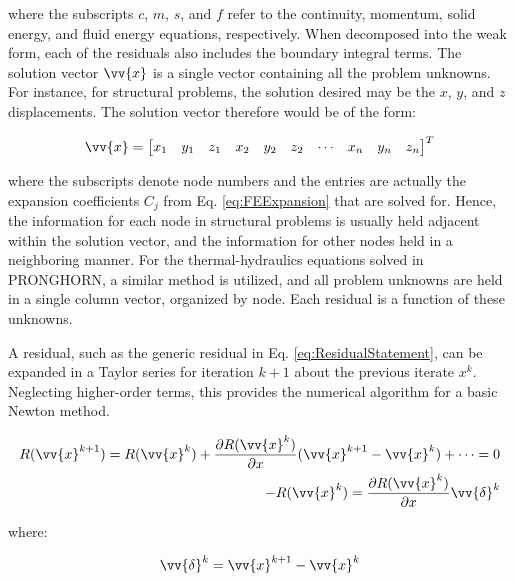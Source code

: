 \documentclass[10pt]{article}
\numberwithin{equation}{section} %
\begin{document}
where the subscripts \(c\), \(m\), \(s\), and \(f\) refer to the continuity, momentum, solid energy, and fluid energy equations, respectively. When decomposed into the weak form, each of the residuals also includes the boundary integral terms. The solution vector \(\vv{x}\) is a single vector containing all the problem unknowns. For instance, for structural problems, the solution desired may be the \(x\), \(y\), and \(z\) displacements. The solution vector therefore would be of the form:

\begin{equation}
\label{eq:solutionvector}
\vv{x}=\begin{bmatrix} x_1 &
				   y_1 &
				   z_1 &
				   x_2 &
				   y_2 &
				   z_2 &
				   \cdots &
				   x_n &
				   y_n &
				   z_n\end{bmatrix}^T
\end{equation}

where the subscripts denote node numbers and the entries are actually the expansion coefficients \(C_j\) from Eq. \eqref{eq:FEExpansion} that are solved for. Hence, the information for each node in structural problems is usually held adjacent within the solution vector, and the information for other nodes held in a neighboring manner. For the thermal-hydraulics equations solved in PRONGHORN, a similar method is utilized, and all problem unknowns are held in a single column vector, organized by node. Each residual is a function of these unknowns. 

A residual, such as the generic residual in Eq. \eqref{eq:ResidualStatement}, can be expanded in a Taylor series for iteration \(k+1\) about the previous iterate \(x^k\). Neglecting higher-order terms, this provides the numerical algorithm for a basic Newton method. 

\begin{equation}
\label{eq:Newton}
\begin{aligned}
R(\vv{x}^{k+1})=R(\vv{x}^k)+\frac{\partial R(\vv{x}^k)}{\partial x}(\vv{x}^{k+1}-\vv{x}^k)+\dots=0\\
-R(\vv{x}^k)=\frac{\partial R(\vv{x}^k)}{\partial x}\vv{\delta}^k\\
\end{aligned}
\end{equation}

where:

\begin{equation}
\label{eq:update}
\vv{\delta}^k=\vv{x}^{k+1}-\vv{x}^k
\end{equation}
\end{document}
